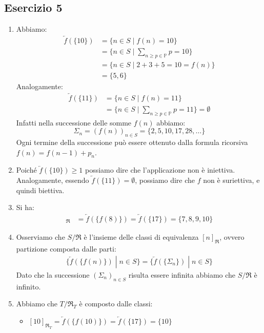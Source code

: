 \subsection*{Esercizio 5}
\begin{enumerate}[label=(\textit{\roman*})]
	\item Abbiamo:
	\begin{align*}
		\overleftarrow{f}(\{10\})&=\{n \in S \; | \; f(n)=10\} \\
		&= \{n \in S \; | \; \sum_{n \geq p \in \mathbb{P}} p = 10 \} \\
		&= \{n \in S \; | \; 2+3+5=10=f(n) \} \\
		&= \{5,6\}
	\end{align*}
	Analogamente:
	\begin{align*}
		\overleftarrow{f}(\{11\})&=\{n \in S \; | \; f(n)=11\} \\
		&= \{n \in S \; | \; \sum_{n \geq p \in \mathbb{P}} p = 11 \} = \emptyset
	\end{align*}
	Infatti nella successione delle somme $f(n)$ abbiamo:
	\begin{equation}
		\Sigma_{n} = (f(n))_{n \in S} =  \{2,5,10,17,28,\ldots\} 
	\end{equation}
	Ogni termine della successione può essere ottenuto dalla formula ricorsiva $f(n) = f(n-1)+p_{n}$.
	\item Poiché $\overleftarrow{f}(\{10\})\geq 1$ possiamo dire che l'applicazione non è iniettiva. Analogamente, essendo $\overleftarrow{f}(\{11\})= \emptyset$, possiamo dire che $f$ non è suriettiva, e quindi biettiva.
	\item Si ha:
	\begin{align*}
		[8]_{\mathfrak{R}} &= \overleftarrow{f}(\{f(8)\}) = \overleftarrow{f} (\{17\}) = \{7,8,9,10\}
	\end{align*}
	\item Osserviamo che $S/{\mathfrak{R}}$ è l'insieme delle classi di equivalenza $[n]_{\mathfrak{R}}$, ovvero partizione composta dalle parti:
	\begin{align*}
		\bigl\{\overleftarrow{f}(\{f(n)\}) \; | \; n \in S \bigr\} = \bigl\{\overleftarrow{f}(\{\Sigma_{n}\}) \; | \; n \in S \bigr\}
	\end{align*}
	Dato che la successione $(\Sigma_{n})_{n \in S}$ risulta essere infinita abbiamo che $S/{\mathfrak{R}}$ è infinito.
	\item Abbiamo che $T/{\mathfrak{R}_{T}}$ è composto dalle classi:
	\begin{itemize}
		\item $[10]_{\mathfrak{R}_{T}}=\overleftarrow{f}(\{f(10)\}) = \overleftarrow{f}(\{17\}) = \{10\}$

\end{itemize}
\end{enumerate}
